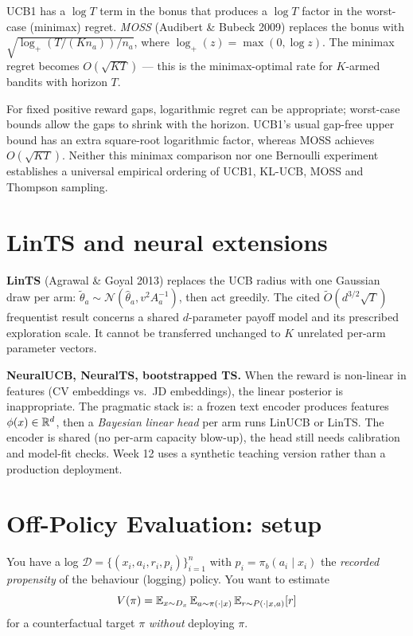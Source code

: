 \documentclass[11pt,oneside]{scrbook}
\begin{document}
UCB1 has a $\log T$ term in the bonus that produces a $\log T$ factor in the
worst-case (minimax) regret. \emph{MOSS} (Audibert \& Bubeck 2009) replaces
the bonus with $\sqrt{\log_+(T/(K n_a)) / n_a}$, where $\log_+(z) = \max(0, \log z)$.
The minimax regret becomes $O(\sqrt{KT})$ --- this is the minimax-optimal
rate for $K$-armed bandits with horizon $T$.

\begin{intuition}
For fixed positive reward gaps, logarithmic regret can be appropriate;
worst-case bounds allow the gaps to shrink with the horizon. UCB1's
usual gap-free upper bound has an extra square-root logarithmic factor,
whereas MOSS achieves $O(\sqrt{KT})$. Neither this minimax comparison nor
one Bernoulli experiment establishes a universal empirical ordering of
UCB1, KL-UCB, MOSS and Thompson sampling.
\end{intuition}



\section{LinTS and neural extensions}

\textbf{LinTS} (Agrawal \& Goyal 2013) replaces the UCB radius with one
Gaussian draw per arm: $\tilde\theta_a \sim \mathcal{N}(\hat\theta_a,
v^2 A_a^{-1})$, then act greedily. The cited $\widetilde O(d^{3/2}\sqrt T)$ frequentist result concerns
a shared $d$-parameter payoff model and its prescribed exploration scale.
It cannot be transferred unchanged to $K$ unrelated per-arm parameter vectors.

\textbf{NeuralUCB, NeuralTS, bootstrapped TS.} When the reward is non-linear
in features (CV embeddings vs.\ JD embeddings), the linear posterior is
inappropriate. The pragmatic stack is: a frozen text encoder produces
features $\phi(x) \in \mathbb{R}^d$, then a \emph{Bayesian linear head} per arm
runs LinUCB or LinTS. The encoder is shared (no per-arm capacity blow-up),
the head still needs calibration and model-fit checks. Week 12 uses
a synthetic teaching version rather than a production deployment.

\section{Off-Policy Evaluation: setup}

You have a log
\(
\mathcal{D} = \{(x_i, a_i, r_i, p_i)\}_{i=1}^n
\)
with $p_i = \pi_b(a_i \mid x_i)$ the \emph{recorded propensity} of the
behaviour (logging) policy. You want to estimate
\[
V(\pi) = \mathbb{E}_{x \sim D_x}\, \mathbb{E}_{a \sim \pi(\cdot \mid x)}\, \mathbb{E}_{r \sim P(\cdot \mid x, a)}[r]
\]
for a counterfactual target $\pi$ \emph{without} deploying $\pi$.
\end{document}
